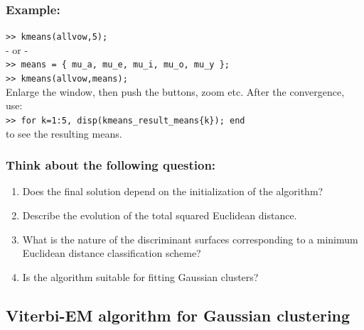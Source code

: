 \documentclass[a4paper]{article}
\newcommand{\mat}[1]{{\tt >> #1} \\}
\begin{document}
\subsubsection*{Example:}
\mat{kmeans(allvow,5);}
- or - \\
\mat{means =  \{ mu\_a, mu\_e, mu\_i, mu\_o, mu\_y \};}
\mat{kmeans(allvow,means);}
Enlarge the window, then push the buttons, zoom etc.
After the convergence, use:\\
\mat{for k=1:5, disp(kmeans\_result\_means\{k\}); end}
to see the resulting means.


\subsubsection*{Think about the following question:}
\begin{enumerate}
\item Does the final solution depend on the initialization of the
  algorithm?
\item Describe the evolution of the total squared Euclidean distance.
\item What is the nature of the discriminant surfaces corresponding to
  a minimum Euclidean distance classification scheme?
\item Is the algorithm suitable for fitting Gaussian clusters?
\end{enumerate}


\subsection{Viterbi-EM algorithm for Gaussian clustering}
\end{document}
